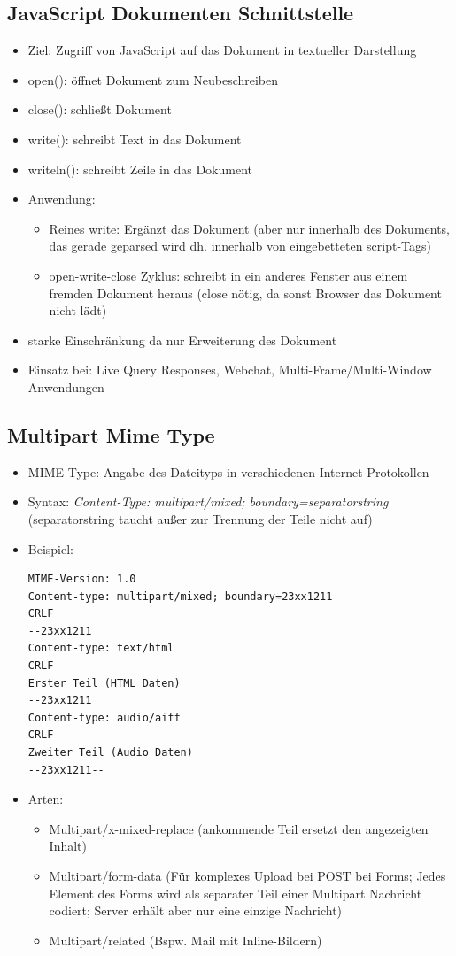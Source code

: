 \documentclass{article} %
\begin{document}
	\subsection{JavaScript Dokumenten Schnittstelle}
	\begin{itemize}
		\item Ziel: Zugriff von JavaScript auf das Dokument in textueller Darstellung
		\item open(): öffnet Dokument zum Neubeschreiben
		\item close(): schließt Dokument
		\item write(): schreibt Text in das Dokument
		\item writeln(): schreibt Zeile in das Dokument
		\item Anwendung:
		\begin{itemize}
			\item Reines write: Ergänzt das Dokument (aber nur innerhalb des Dokuments, das gerade geparsed wird dh. innerhalb von eingebetteten script-Tags)
			\item open-write-close Zyklus: schreibt in ein anderes Fenster aus einem fremden Dokument heraus (close nötig, da sonst Browser das Dokument nicht lädt)
		\end{itemize}
		\item starke Einschränkung da nur Erweiterung des Dokument
		\item Einsatz bei: Live Query Responses, Webchat, Multi-Frame/Multi-Window Anwendungen
	\end{itemize}
	\subsection{Multipart Mime Type}
	\begin{itemize}
		\item MIME Type: Angabe des Dateityps in verschiedenen Internet Protokollen
		\item Syntax: \textit{Content-Type: multipart/mixed; boundary=separatorstring}\\
		(separatorstring taucht außer zur Trennung der Teile nicht auf)
		\item Beispiel:
		\begin{lstlisting}
MIME-Version: 1.0
Content-type: multipart/mixed; boundary=23xx1211
CRLF
--23xx1211
Content-type: text/html
CRLF
Erster Teil (HTML Daten)
--23xx1211
Content-type: audio/aiff
CRLF
Zweiter Teil (Audio Daten)
--23xx1211--
		\end{lstlisting}
		\item Arten:
		\begin{itemize}
			\item Multipart/x-mixed-replace (ankommende Teil ersetzt den angezeigten Inhalt)
			\item Multipart/form-data (Für komplexes Upload bei POST bei Forms; Jedes Element des Forms wird als separater Teil einer Multipart Nachricht codiert; Server erhält aber nur eine einzige Nachricht)
			\item Multipart/related (Bspw. Mail mit Inline-Bildern)
		\end{itemize}
	\end{itemize}
\end{document}
